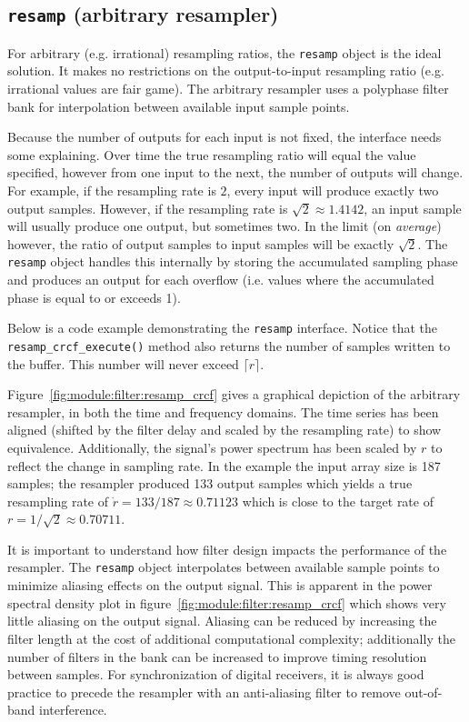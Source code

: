 % 
%
\subsection{{\tt resamp} (arbitrary resampler)}
\label{module:filter:resamp}
For arbitrary (e.g. irrational) resampling ratios, the {\tt resamp}
object is the ideal solution.
It makes no restrictions on the output-to-input resampling ratio
(e.g. irrational values are fair game).
The arbitrary resampler uses a polyphase filter bank for interpolation
between available input sample points.

Because the number of outputs for each input is not fixed, the interface needs
some explaining.
Over time the true resampling ratio will equal the value specified, however
from one input to the next, the number of outputs will change.
For example, if the resampling rate is $2$, every input will produce exactly
two output samples.
However, if the resampling rate is $\sqrt{2} \approx 1.4142$, an input sample
will usually produce one output, but sometimes two.
In the limit (on {\it average}) however, the ratio of output samples to input
samples will be exactly $\sqrt{2}$.
The {\tt resamp} object handles this internally by storing the accumulated
sampling phase and produces an output for each overflow (i.e. values where the
accumulated phase is equal to or exceeds 1).

Below is a code example demonstrating the {\tt resamp} interface.
Notice that the {\tt resamp\_crcf\_execute()} method also returns the number
of samples written to the buffer.
This number will never exceed $\lceil r \rceil$.
%

%
Figure~\ref{fig:module:filter:resamp_crcf} gives a graphical depiction
of the arbitrary resampler, in both the time and frequency domains.
The time series has been aligned (shifted by the filter delay and scaled by
the resampling rate) to show equivalence.
Additionally, the signal's power spectrum has been scaled by $r$ to reflect
the change in sampling rate.
In the example the input array size is 187 samples;
the resampler produced 133 output samples which yields a true resampling
rate of $\dot{r} = 133/187 \approx 0.71123$ which is close to the target
rate of $r = 1/\sqrt{2} \approx 0.70711$.

It is important to understand how filter design impacts the performance of the
resampler.
The {\tt resamp} object interpolates between available sample points to
minimize aliasing effects on the output signal.
This is apparent in the power spectral density plot in
figure~\ref{fig:module:filter:resamp_crcf} which shows very little aliasing on
the output signal.
Aliasing can be reduced by increasing the filter length at the cost of
additional computational complexity;
additionally the number of filters in the bank can be increased to
improve timing resolution between samples.
For synchronization of digital receivers, it is always good practice to
precede the resampler with an anti-aliasing filter to remove out-of-band
interference.

